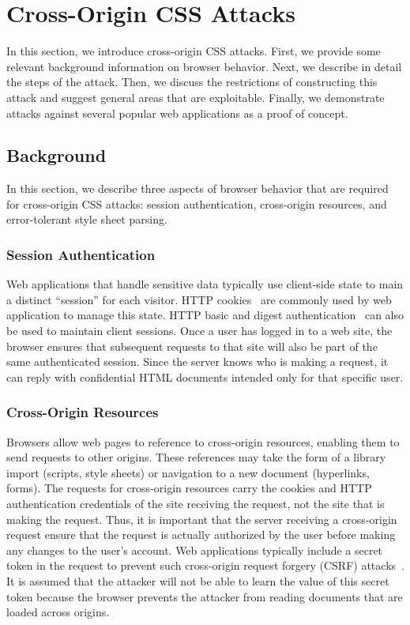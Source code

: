 \documentclass{acm_proc_article-sp}
\begin{document}
\section{Cross-Origin CSS Attacks} \label{sec:attacks}
In this section, we introduce cross-origin CSS attacks. First, we provide some
relevant background information on browser behavior. Next, we describe in
detail the steps of the attack. Then, we discuss the restrictions of
constructing this attack and suggest general areas that are exploitable.
Finally, we demonstrate attacks against several popular web applications as a proof of concept.

\subsection{Background}

In this section, we describe three aspects of browser behavior that are required for cross-origin CSS attacks: session authentication, cross-origin resources, and error-tolerant style sheet parsing.

\subsubsection{Session Authentication}
Web applications that handle sensitive data typically use client-side state to
main a distinct ``session'' for each visitor. HTTP cookies~\cite{rfc2109,
httpstate} are commonly used by web application to manage this state. HTTP
basic and digest authentication~\cite{rfc2617} can also be used to maintain
client sessions. Once a user has logged in to a web site, the browser ensures
that subsequent requests to that site will also be part of the same
authenticated session. Since the server knows who is making a request, it can
reply with confidential HTML documents intended only for that specific user.

\subsubsection{Cross-Origin Resources}
Browsers allow web pages to reference to cross-origin resources, enabling them to send requests to other origins. These references may take the form of a library import (scripts, style sheets) or navigation to a new document (hyperlinks, forms). The requests for cross-origin resources carry the cookies and HTTP authentication credentials of the site receiving the request, not the site that is making the request. Thus, it is important that the server receiving a cross-origin request ensure that the request is actually authorized by the user before making any changes to the user's account. Web applications typically include a secret token in the request to prevent such cross-origin request forgery (CSRF) attacks~\cite{csrf}. It is assumed that the attacker will not be able to learn the value of this secret token because the browser prevents the attacker from reading documents that are loaded across origins.
\end{document}
